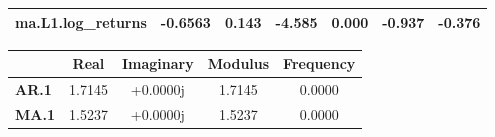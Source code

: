 \begin{center}
\begin{tabular}{lcccccc}
\textbf{ma.L1.log\_returns} &      -0.6563  &        0.143     &    -4.585  &         0.000        &       -0.937    &       -0.376     \\
\bottomrule
\end{tabular}
\begin{tabular}{lcccc}
              & \textbf{            Real} & \textbf{         Imaginary} & \textbf{         Modulus} & \textbf{        Frequency}  \\
\midrule
\textbf{AR.1} &                1.7145     &                +0.0000j     &                1.7145     &                0.0000       \\
\textbf{MA.1} &                1.5237     &                +0.0000j     &                1.5237     &                0.0000       \\
\bottomrule
\end{tabular}
\end{center}
